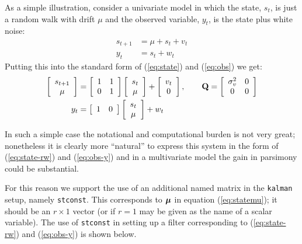 As a simple illustration, consider a univariate model in which the
state, $s_t$, is just a random walk with drift $\mu$ and the observed
variable, $y_t$, is the state plus white noise:
\begin{align}
  \label{eq:state-rw}
  s_{t+1} &=  \mu + s_t + v_t \\
  \label{eq:obs-y}
  y_t &= s_t + w_t 
\end{align}
%
Putting this into the standard form of (\ref{eq:state}) and
(\ref{eq:obs}) we get:
%
\begin{align*}
\left[ \begin{array}{c} s_{t+1} \\ \mu \end{array} \right] 
&=
\left[ \begin{array}{cc} 1 & 1 \\ 0 & 1 \end{array} \right]
\left[ \begin{array}{c} s_t \\ \mu \end{array} \right] +
\left[ \begin{array}{c} v_t \\ 0 \end{array} \right] ,
\qquad
\mathbf{Q} = \left[ 
\begin{array}{cc} \sigma^2_v & 0 \\ 0 & 0 \end{array} 
\right] \\
y_t &= 
\left[ \begin{array}{cc} 1 & 0 \end{array} \right]
\left[ \begin{array}{c} s_t \\ \mu \end{array} \right] + w_t
\end{align*}

In such a simple case the notational and computational burden is not
very great; nonetheless it is clearly more ``natural'' to express this
system in the form of (\ref{eq:state-rw}) and (\ref{eq:obs-y}) and in
a multivariate model the gain in parsimony could be substantial.

For this reason we support the use of an additional named matrix
in the \texttt{kalman} setup, namely \texttt{stconst}. This
corresponds to $\bm{\mu}$ in equation (\ref{eq:statemu}); it
should be an $r \times 1$ vector (or if $r=1$ may be given as
the name of a scalar variable). The use of \texttt{stconst}
in setting up a filter corresponding to (\ref{eq:state-rw}) and
(\ref{eq:obs-y}) is shown below.


